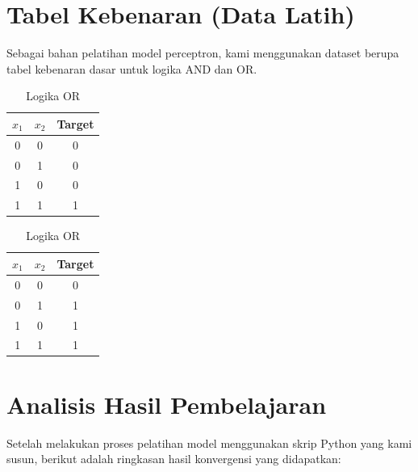 \documentclass[12pt,a4paper]{article}
\begin{document}
\section{Tabel Kebenaran (Data Latih)}

Sebagai bahan pelatihan model perceptron, kami menggunakan dataset berupa tabel kebenaran dasar untuk logika AND dan OR.

\begin{table}[H]
    \centering
    \begin{minipage}{.45\linewidth}
      \centering
      \caption{Logika AND}
      \vspace{0.2cm}
      \begin{tabular}{cc|c}
        \toprule
        $x_1$ & $x_2$ & Target \\
        \midrule
        0 & 0 & 0 \\
        0 & 1 & 0 \\
        1 & 0 & 0 \\
        1 & 1 & 1 \\
        \bottomrule
      \end{tabular}
    \end{minipage}%
    \begin{minipage}{.45\linewidth}
      \centering
      \caption{Logika OR}
      \vspace{0.2cm}
      \begin{tabular}{cc|c}
        \toprule
        $x_1$ & $x_2$ & Target \\
        \midrule
        0 & 0 & 0 \\
        0 & 1 & 1 \\
        1 & 0 & 1 \\
        1 & 1 & 1 \\
        \bottomrule
      \end{tabular}
    \end{minipage}
\end{table}

\section{Analisis Hasil Pembelajaran}

Setelah melakukan proses pelatihan model menggunakan skrip Python yang kami susun, berikut adalah ringkasan hasil konvergensi yang didapatkan:
\end{document}
